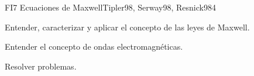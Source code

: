 \begin{syllabus}
\begin{unit}{FI7 Ecuaciones de Maxwell}{Tipler98, Serway98, Resnick98}{4}
   \begin{learningoutcomes}
         \item  Entender, caracterizar y aplicar el concepto de las leyes de Maxwell.
         \item  Entender el concepto de ondas electromagnéticas.
         \item  Resolver problemas.
   \end{learningoutcomes}
\end{unit}

\begin{coursebibliography}
\end{coursebibliography}

\end{syllabus}
